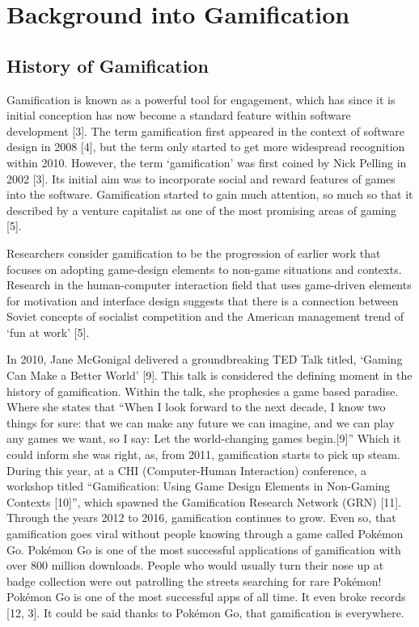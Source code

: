 \chapter{Background into Gamification}
	\label{chap:resources}
		

	\section{History of Gamification}
		
		Gamification is known as a powerful tool for engagement, which has since it is initial conception has now become a standard feature within software development [3]. The term gamification first appeared in the context of software design in 2008 [4], but the term only started to get more widespread recognition within 2010. However, the term ‘gamification’ was first coined by Nick Pelling in 2002 [3]. Its initial aim was to incorporate social and reward features of games into the software. Gamification started to gain much attention, so much so that it described by a venture capitalist as one of the most promising areas of gaming [5].
		
		Researchers consider gamification to be the progression of earlier work that focuses on adopting game-design elements to non-game situations and contexts. Research in the human-computer interaction field that uses game-driven elements for motivation and interface design suggests that there is a connection between Soviet concepts of socialist competition and the American management trend of ‘fun at work’ [5].
		
		In 2010, Jane McGonigal delivered a groundbreaking TED Talk titled, ‘Gaming Can Make a Better World’ [9]. This talk is considered the defining moment in the history of gamification. Within the talk, she prophesies a game based paradise. Where she states that “When I look forward to the next decade, I know two things for sure: that we can make any future we can imagine, and we can play any games we want, so I say: Let the world-changing games begin.[9]” Which it could inform she was right, as, from 2011, gamification starts to pick up steam. During this year, at a CHI (Computer-Human Interaction) conference, a workshop titled “Gamification: Using Game Design Elements in Non-Gaming Contexts [10]”, which spawned the Gamification Research Network (GRN) [11]. Through the years 2012 to 2016, gamification continues to grow. Even so, that gamification goes viral without people knowing through a game called Pokémon Go. Pokémon Go is one of the most successful applications of gamification with over 800 million downloads. People who would usually turn their nose up at badge collection were out patrolling the streets searching for rare Pokémon! Pokémon Go is one of the most successful apps of all time. It even broke records [12, 3]. It could be said thanks to Pokémon Go, that gamification is everywhere.
		
